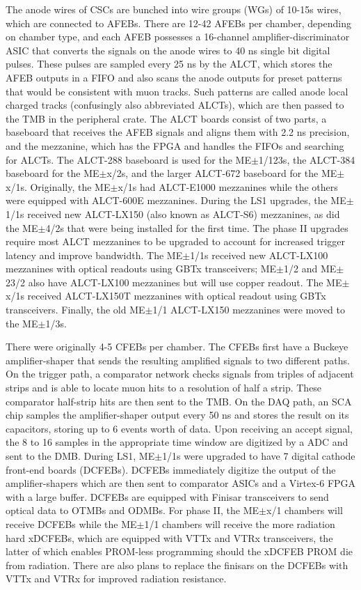 \documentclass[10pt,a4paper]{article}
\begin{document}
The anode wires of CSCs are bunched into wire groups (WGs) of 10-15s wires, which are connected to AFEBs. There are 12-42 AFEBs per chamber, depending on chamber type, and each AFEB possesses a 16-channel amplifier-discriminator ASIC that converts the signals on the anode wires to 40 ns single bit digital pulses. These pulses are sampled every 25 ns by the ALCT, which stores the AFEB outputs in a FIFO and also scans the anode outputs for preset patterns that would be consistent with muon tracks. Such patterns are called anode local charged tracks (confusingly also abbreviated ALCTs), which are then passed to the TMB in the peripheral crate. The ALCT boards consist of two parts, a baseboard that receives the AFEB signals and aligns them with 2.2 ns precision, and the mezzanine, which has the FPGA and handles the FIFOs and searching for ALCTs. The ALCT-288 baseboard is used for the ME$\pm$1/123s, the ALCT-384 baseboard for the ME$\pm$x/2s, and the larger ALCT-672 baseboard for the ME$\pm$x/1s. Originally, the ME$\pm$x/1s had ALCT-E1000 mezzanines while the others were equipped with ALCT-600E mezzanines. During the LS1 upgrades, the ME$\pm$1/1s received new ALCT-LX150 (also known as ALCT-S6) mezzanines, as did the ME$\pm$4/2s that were being installed for the first time. The phase II upgrades require most ALCT mezzanines to be upgraded to account for increased trigger latency and improve bandwidth. The ME$\pm$1/1s received new ALCT-LX100 mezzanines with optical readouts using GBTx transceivers; ME$\pm$1/2 and ME$\pm$23/2 also have ALCT-LX100 mezzanines but will use copper readout. The ME$\pm$x/1s received ALCT-LX150T mezzanines with optical readout using GBTx transceivers. Finally, the old ME$\pm$1/1 ALCT-LX150 mezzanines were moved to the ME$\pm$1/3s. 

There were originally 4-5 CFEBs per chamber. The CFEBs first have a Buckeye amplifier-shaper that sends the resulting amplified signals to two different paths. On the trigger path, a comparator network checks signals from triples of adjacent strips and is able to locate muon hits to a resolution of half a strip. These comparator half-strip hits are then sent to the TMB. On the DAQ path, an SCA chip samples the amplifier-shaper output every 50 ns and stores the result on its capacitors, storing up to 6 events worth of data. Upon receiving an accept signal, the 8 to 16 samples in the appropriate time window are digitized by a ADC and sent to the DMB. During LS1, ME$\pm$1/1s were upgraded to have 7 digital cathode front-end boards (DCFEBs). DCFEBs immediately digitize the output of the amplifier-shapers which are then sent to comparator ASICs and a Virtex-6 FPGA with a large buffer. DCFEBs are equipped with Finisar transceivers to send optical data to OTMBs and ODMBs. For phase II, the ME$\pm$x/1 chambers will receive DCFEBs while the ME$\pm$1/1 chambers will receive the more radiation hard xDCFEBs, which are equipped with VTTx and VTRx transceivers, the latter of which enables PROM-less programming should the xDCFEB PROM die from radiation. There are also plans to replace the finisars on the DCFEBs with VTTx and VTRx for improved radiation resistance. 
\end{document}
